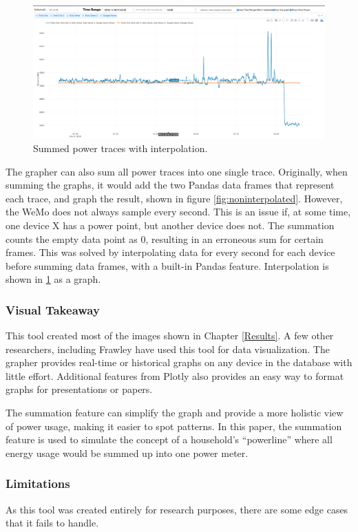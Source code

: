 \begin{figure}[H]
    \centering
    \includegraphics[width=1\textwidth]{figures/interpolated.png}
    \caption{Summed power traces with interpolation.}
    \label{fig:interpolated}
\end{figure}

The grapher can also sum all power traces into one single trace. Originally, when summing the graphs, it would add the two Pandas data frames that represent each trace, and graph the result, shown in figure \ref{fig:noninterpolated}. However, the WeMo does not always sample every second. This is an issue if, at some time, one device X has a power point, but another device does not. The summation counts the empty data point as 0, resulting in an erroneous sum for certain frames. This was solved by interpolating data for every second for each device before summing data frames, with a built-in Pandas feature. Interpolation is shown in \ref{fig:interpolated} as a graph.

\subsubsection{Visual Takeaway}
This tool created most of the images shown in Chapter \ref{Results}. A few other researchers, including Frawley have used this tool for data visualization. The grapher provides real-time or historical graphs on any device in the database with little effort. Additional features from Plotly also provides an easy way to format graphs for presentations or papers.

The summation feature can simplify the graph and provide a more holistic view of power usage, making it easier to spot patterns. In this paper, the summation feature is used to simulate the concept of a household's ``powerline'' where all energy usage would be summed up into one power meter.

\subsubsection{Limitations}
As this tool was created entirely for research purposes, there are some edge cases that it fails to handle.

